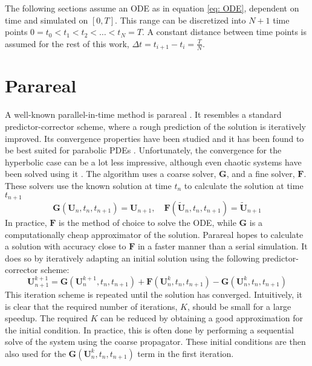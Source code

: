 The following sections assume an ODE as in equation \ref{eq: ODE}, dependent on time and simulated on $[0, T]$.
This range can be discretized into $N + 1$ time points $0 = t_0 < t_1 < t_2 < \hdots < t_{N} = T$. A constant distance between time points is assumed for the rest of this work, $\Delta t = t_{i+1} - t_i = \frac{T}{N}$.

\section{Parareal}
\label{sec: parareal}
A well-known parallel-in-time method is parareal \cite{lions_resolution_2001,gander_analysis_2014,d_samaddar_parallelization_2010, bal_symplectic_2008}. It resembles a standard predictor-corrector scheme, where a rough prediction of the solution is iteratively improved. Its convergence properties have been studied and it has been found to be best suited for parabolic PDEs \cite{gander_analysis_2007}. Unfortunately, the convergence for the hyperbolic case can be a lot less impressive, although even chaotic systems have been solved using it \cite{d_samaddar_parallelization_2010}. The algorithm uses a coarse solver, $\textbf{G}$, and a fine solver, $\textbf{F}$. These solvers use the known solution at time $t_n$ to calculate the solution at time $t_{n+1}$ 
\[\textbf{G}(\textbf{U}_n, t_n, t_{n+1}) = \textbf{U}_{n+1}, \quad
\textbf{F}(\tilde{\textbf{U}}_n, t_n, t_{n+1}) = \tilde{\textbf{U}}_{n+1}
\]
In practice, $\textbf{F}$ is the method of choice to solve the ODE, while $\textbf{G}$ is a computationally cheap approximator of the solution. Parareal hopes to calculate a solution with accuracy close to $\textbf{F}$ in a faster manner than a serial simulation. It does so by iteratively adapting an initial solution using the following predictor-corrector scheme:
\begin{equation}
\textbf{U}_{n+1}^{k+1} = \textbf{G}(\textbf{U}_n^{k+1}, t_n, t_{n+1}) + \textbf{F}(\textbf{U}_n^k, t_n, t_{n+1}) - \textbf{G}(\textbf{U}_n^k, t_n, t_{n+1})
\end{equation}
This iteration scheme is repeated until the solution has converged. 
Intuitively, it is clear that the required number of iterations, $K$, should be small for a large speedup. The required $K$ can be reduced by obtaining a good approximation for the initial condition. In practice, this is often done by performing a sequential solve of the system using the coarse propagator. These initial conditions are then also used for the $\textbf{G}(\textbf{U}_n^k, t_n, t_{n+1})$ term in the first iteration. 

